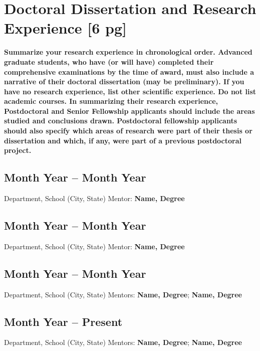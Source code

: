 \documentclass[11pt]{article}
\begin{document}

\section*{Doctoral Dissertation and Research Experience [6 pg]}
\textbf{Summarize your research experience in chronological order. Advanced graduate students, who have (or will have) completed their comprehensive examinations by the time of award, must also include a narrative of their doctoral dissertation (may be preliminary). If you have no research experience, list other scientific experience. Do not list academic courses. In summarizing their research experience, Postdoctoral and Senior Fellowship applicants should include the areas studied and conclusions drawn. Postdoctoral fellowship applicants should also specify which areas of research were part of their thesis or dissertation and which, if any, were part of a previous postdoctoral project.}

\subsection*{Month Year -- Month Year}
Department, School (City, State) \newline
Mentor: \textbf{Name, Degree}

\lipsum[2-3]

\subsection*{Month Year -- Month Year}
Department, School (City, State) \newline
Mentor: \textbf{Name, Degree}

\lipsum[4]

\subsection*{Month Year -- Month Year}
Department, School (City, State) \newline
Mentors: \textbf{Name, Degree}; \textbf{Name, Degree}

\lipsum[5]


\subsection*{Month Year -- Present}
Department, School (City, State) \newline
Mentors: \textbf{Name, Degree}; \textbf{Name, Degree}
\end{document}
